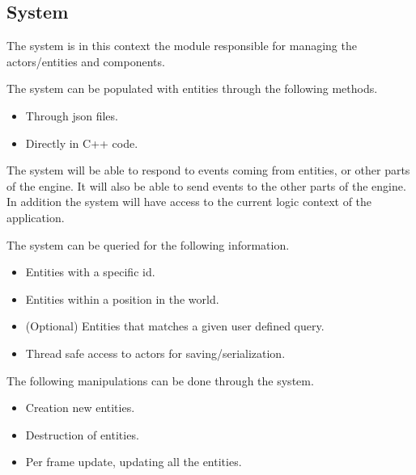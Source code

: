 \subsection{System}
The system is in this context the module responsible for managing the actors/entities and components.

The system can be populated with entities through the following methods.
\begin{itemize}
    \item
    Through json files.

    \item
    Directly in C++ code.
\end{itemize}

The system will be able to respond to events coming from entities, or other parts of the engine. 
It will also be able to send events to the other parts of the engine.
In addition the system will have access to the current logic context of the application.

The system can be queried for the following information.
\begin{itemize}
    \item
    Entities with a specific id.

    \item
    Entities within a position in the world.

    \item
    (Optional) Entities that matches a given user defined query.

    \item
    Thread safe access to actors for saving/serialization.
\end{itemize}

The following manipulations can be done through the system.
\begin{itemize}
    \item
    Creation new entities.

    \item
    Destruction of entities.

    \item
    Per frame update, updating all the entities.
\end{itemize}
